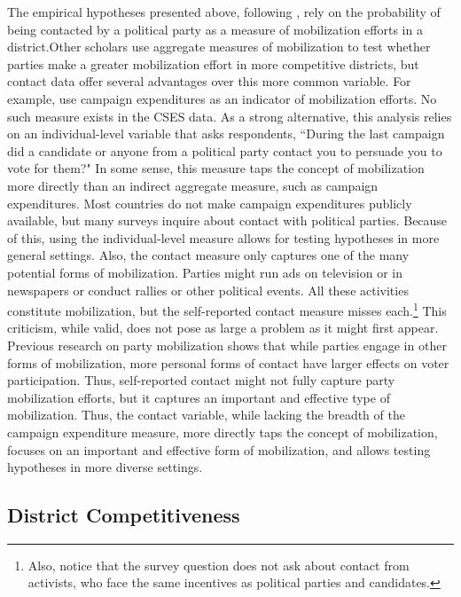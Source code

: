 \documentclass[12pt]{article}
\begin{document}
The empirical hypotheses presented above, following \cite{KarpBanducciBowler2007}, rely on the probability of being contacted by a political party as a measure of mobilization efforts in a district.Other scholars use aggregate measures of mobilization to test whether parties make a greater mobilization effort in more competitive districts, but contact data offer several advantages over this more common variable. For example, \cite{CoxMunger1989} use campaign expenditures as an indicator of mobilization efforts. No such measure exists in the CSES data. As a strong alternative, this analysis relies on an individual-level variable that asks respondents, ``During the last campaign did a candidate or anyone from a political party contact you to persuade you to vote for them?" In some sense, this measure taps the concept of mobilization more directly than an indirect aggregate measure, such as campaign expenditures. Most countries do not make campaign expenditures publicly available, but many surveys inquire about contact with political parties. Because of this, using the individual-level measure allows for testing hypotheses in more general settings. Also, the contact measure only captures one of the many potential forms of mobilization. Parties might run ads on television or in newspapers or conduct rallies or other political events. All these activities constitute mobilization, but the self-reported contact measure misses each.\footnote{Also, notice that the survey question does not ask about contact from activists, who face the same incentives as political parties and candidates.} This criticism, while valid, does not pose as large a problem as it might first appear. Previous research on party mobilization \citep{GerberGreen2000, HuckfeldtSprague1992} shows that while parties engage in other forms of mobilization, more personal forms of contact have larger effects on voter participation. Thus, self-reported contact might not fully capture party mobilization efforts, but it captures an important and effective type of mobilization. Thus, the contact variable, while lacking the breadth of the campaign expenditure measure, more directly taps the concept of mobilization, focuses on an important and effective form of mobilization, and allows testing hypotheses in more diverse settings.

\subsection*{District Competitiveness}
\end{document}
